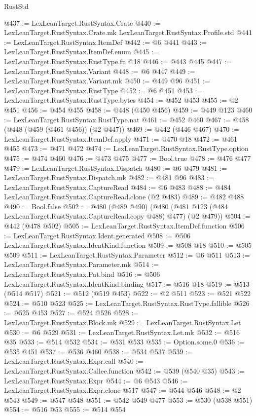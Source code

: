 \begin{lexlean}{RustStd}
\begin{coremodule}
@437 := LexLeanTarget.RustSyntax.Crate
@440 := LexLeanTarget.RustSyntax.Crate.mk LexLeanTarget.RustSyntax.Profile.std
@441 := LexLeanTarget.RustSyntax.ItemDef
@442 := @6 @441
@443 := LexLeanTarget.RustSyntax.ItemDef.enum
@445 := LexLeanTarget.RustSyntax.RustType.fn @18
@446 := @443 @445
@447 := LexLeanTarget.RustSyntax.Variant
@448 := @6 @447
@449 := LexLeanTarget.RustSyntax.Variant.mk
@450 := @449 @96
@451 := LexLeanTarget.RustSyntax.RustType
@452 := @6 @451
@453 := LexLeanTarget.RustSyntax.RustType.bytes
@454 := @452 @453
@455 := @2 @451
@456 := @454 @455
@458 := @448 (@450 @456)
@459 := @449 @123
@460 := LexLeanTarget.RustSyntax.RustType.nat
@461 := @452 @460
@467 := @458 (@448 (@459 (@461 @456)) (@2 @447))
@469 := @442 (@446 @467)
@470 := LexLeanTarget.RustSyntax.ItemDef.apply
@471 := @470 @18
@472 := @461 @455
@473 := @471 @472
@474 := LexLeanTarget.RustSyntax.RustType.option
@475 := @474 @460
@476 := @473 @475
@477 := Bool.true
@478 := @476 @477
@479 := LexLeanTarget.RustSyntax.Dispatch
@480 := @6 @479
@481 := LexLeanTarget.RustSyntax.Dispatch.mk
@482 := @481 @96
@483 := LexLeanTarget.RustSyntax.CaptureRead
@484 := @6 @483
@488 := @484 LexLeanTarget.RustSyntax.CaptureRead.clone (@2 @483)
@489 := @482 @488
@490 := Bool.false
@502 := @480
    (@489 @490)
    (@480 (@481 @123 (@484 LexLeanTarget.RustSyntax.CaptureRead.copy @488) @477) (@2 @479))
@504 := @442 (@478 @502)
@505 := LexLeanTarget.RustSyntax.ItemDef.function
@506 := LexLeanTarget.RustSyntax.Ident.generated
@508 := @506 LexLeanTarget.RustSyntax.IdentKind.function
@509 := @508 @18
@510 := @505 @509
@511 := LexLeanTarget.RustSyntax.Parameter
@512 := @6 @511
@513 := LexLeanTarget.RustSyntax.Parameter.mk
@514 := LexLeanTarget.RustSyntax.Pat.bind
@516 := @506 LexLeanTarget.RustSyntax.IdentKind.binding
@517 := @516 @18
@519 := @513 (@514 @517)
@521 := @512 (@519 @453)
@522 := @2 @511
@523 := @521 @522
@524 := @510 @523
@525 := LexLeanTarget.RustSyntax.RustType.fallible
@526 := @525 @453
@527 := @524 @526
@528 := LexLeanTarget.RustSyntax.Block.mk
@529 := LexLeanTarget.RustSyntax.Let
@530 := @6 @529
@531 := LexLeanTarget.RustSyntax.Let.mk
@532 := @516 @35
@533 := @514 @532
@534 := @531 @533
@535 := Option.some.{0}
@536 := @535 @451
@537 := @536 @460
@538 := @534 @537
@539 := LexLeanTarget.RustSyntax.Expr.call
@540 := LexLeanTarget.RustSyntax.Callee.function
@542 := @539 (@540 @35)
@543 := LexLeanTarget.RustSyntax.Expr
@544 := @6 @543
@546 := LexLeanTarget.RustSyntax.Expr.clone @517
@547 := @544 @546
@548 := @2 @543
@549 := @547 @548
@551 := @542 @549 @477
@553 := @530 (@538 @551)
@554 := @516 @53
@555 := @514 @554

\end{coremodule}
\end{lexlean}
